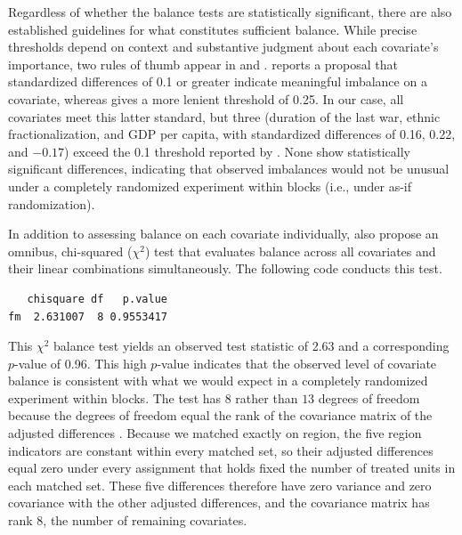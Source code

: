 \documentclass[
  12pt,
  leqno]{article}
\newenvironment{Shaded}{\begin{snugshade}}{\end{snugshade}}
\newcommand{\CommentTok}[1]{\textcolor[rgb]{0.56,0.35,0.01}{\textit{#1}}}
\newcommand{\NormalTok}[1]{#1}
\newcommand{\SpecialCharTok}[1]{\textcolor[rgb]{0.81,0.36,0.00}{\textbf{#1}}}
\newcommand{\StringTok}[1]{\textcolor[rgb]{0.31,0.60,0.02}{#1}}
\begin{document}
Regardless of whether the balance tests are statistically significant,
there are also established guidelines for what constitutes sufficient
balance. While precise thresholds depend on context and substantive
judgment about each covariate's importance, two rules of thumb appear in
\citet{austin2009} and \citet{stuart2010}. \citet{austin2009} reports a
proposal that standardized differences of 0.1 or greater indicate
meaningful imbalance on a covariate, whereas \citet[p.~11]{stuart2010}
gives a more lenient threshold of 0.25. In our case, all covariates meet
this latter standard, but three (duration of the last war, ethnic
fractionalization, and GDP per capita, with standardized differences of
0.16, 0.22, and \(-0.17\)) exceed the 0.1 threshold reported by
\citet[p.~3090]{austin2009}. None show statistically significant
differences, indicating that observed imbalances would not be unusual
under a completely randomized experiment within blocks (i.e., under
as-if randomization).

In addition to assessing balance on each covariate individually,
\citet{hansenbowers2008} also propose an omnibus, chi-squared
(\(\chi^2\)) test that evaluates balance across all covariates and their
linear combinations simultaneously. The following code conducts this
test.

\singlespacing

\begin{Shaded}
\end{Shaded}

\begin{verbatim}
   chisquare df   p.value
fm  2.631007  8 0.9553417
\end{verbatim}

\doublespacing

This \(\chi^2\) balance test yields an observed test statistic of 2.63
and a corresponding \(p\)-value of 0.96. This high \(p\)-value indicates
that the observed level of covariate balance is consistent with what we
would expect in a completely randomized experiment within blocks. The
test has \(8\) rather than \(13\) degrees of freedom because the degrees
of freedom equal the rank of the covariance matrix of the adjusted
differences \citep[p.~229]{hansenbowers2008}. Because we matched exactly
on region, the five region indicators are constant within every matched
set, so their adjusted differences equal zero under every assignment
that holds fixed the number of treated units in each matched set. These
five differences therefore have zero variance and zero covariance with
the other adjusted differences, and the covariance matrix has rank
\(8\), the number of remaining covariates.
\end{document}
